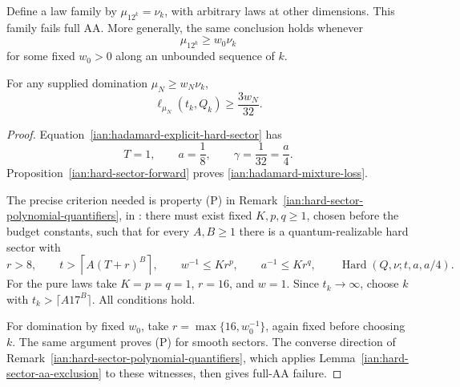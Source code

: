 \begin{corollary}
\label{ian:hadamard-full-aa}
Define a law family by \(\mu_{12^k}=\nu_k\), with arbitrary laws at other dimensions. This family fails full AA. More generally, the same conclusion holds whenever
\[
 \mu_{12^k}\ge w_0\nu_k
\]
for some fixed \(w_0>0\) along an unbounded sequence of \(k\).

For any supplied domination \(\mu_N\ge w_N\nu_k\),
\[
 \ell_{\mu_N}(t_k,Q_k)\ge\frac{3w_N}{32}.
 \tag{34.8}\label{ian:hadamard-mixture-loss}
\]
\end{corollary}
\begin{proof}
Equation~\eqref{ian:hadamard-explicit-hard-sector} has
\[
 T=1,\qquad a=\frac18,\qquad \gamma=\frac1{32}=\frac a4.
\]
Proposition~\ref{ian:hard-sector-forward} proves
\eqref{ian:hadamard-mixture-loss}.

The precise criterion needed is property (P) in
Remark~\ref{ian:hard-sector-polynomial-quantifiers}, in
:
there must exist fixed \(K,p,q\ge1\), chosen before the budget constants,
such that for every \(A,B\ge1\) there is a quantum-realizable hard sector with
\[
 r>8,\qquad
 t>\left\lceil A(T+r)^B\right\rceil,\qquad
 w^{-1}\le Kr^p,\qquad a^{-1}\le Kr^q,
 \qquad
 \operatorname{Hard}(Q,\nu;t,a,a/4).
\]
For the pure laws take \(K=p=q=1\), \(r=16\), and \(w=1\).
Since \(t_k\to\infty\), choose \(k\) with
\(t_k>\lceil A17^B\rceil\). All conditions hold.

For domination by fixed \(w_0\), take
\(r=\max\{16,w_0^{-1}\}\), again fixed before choosing \(k\).
The same argument proves (P) for smooth sectors. The converse direction of
Remark~\ref{ian:hard-sector-polynomial-quantifiers}, which applies
Lemma~\ref{ian:hard-sector-aa-exclusion} to these witnesses, then gives
full-AA failure.
\end{proof}

